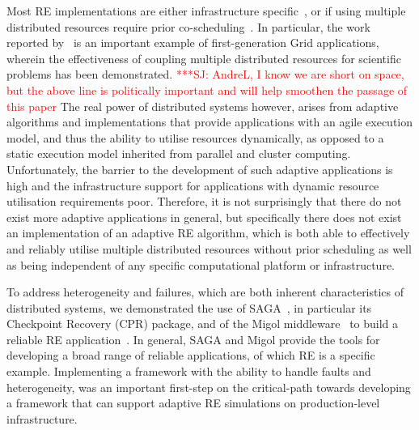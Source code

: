 \documentclass{rspublic}
\newcommand{\jhanote}[1]{ {\textcolor{red} { ***SJ: #1 }}}
\newcommand{\jhanote}[1]{}
\begin{document}
Most RE implementations are either infrastructure
specific~\citep{Woods:2005nx}, or if using multiple distributed
resources require prior co-scheduling~\citep{repex_mpig}. 
In particular, the work reported by~\citet{repex_mpig} is an important
example of first-generation Grid applications, wherein the
effectiveness of coupling multiple distributed resources for
scientific problems has been demonstrated.  \jhanote{AndreL, I know we
  are short on space, but the above line is politically important and
  will help smoothen the passage of this paper} The real power of
distributed systems however, arises from adaptive algorithms and
implementations that provide applications with an agile execution
model, and thus the ability to utilise resources dynamically, as
opposed to a static execution model inherited from parallel and
cluster computing.  Unfortunately, the barrier to the development of
such adaptive applications is high and the infrastructure support for
applications with dynamic resource utilisation requirements poor.
Therefore, it is not surprisingly that there do not exist more
adaptive applications in general, but specifically there does not
exist an implementation of an adaptive RE algorithm, which is both
able to effectively and reliably utilise multiple distributed
resources without prior scheduling as well as being independent of any
specific computational platform or infrastructure.
                      
To address heterogeneity and failures, which are both inherent
characteristics of distributed systems, we demonstrated the use of
SAGA~\citep{saga_gfd90}, in particular its Checkpoint Recovery (CPR)
package, and of the Migol middleware~\citep{schnorLuckow08} to build a
reliable RE application~\citep{Luckow:2008la}.
In general, SAGA and Migol provide the tools for developing a broad
range of reliable applications, of which RE is a specific example.
Implementing a framework with the ability to handle faults and
heterogeneity, was an important first-step on the critical-path
towards developing a framework that can support adaptive RE simulations on
production-level infrastructure.
\end{document}
